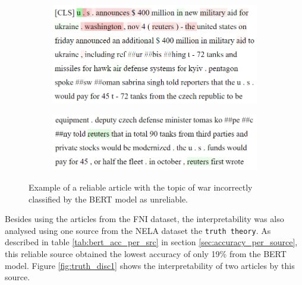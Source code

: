 \begin{figure}[H]
    \centering
    \begin{subfigure}{.5\textwidth}
      \centering
      \includegraphics[width=\linewidth]{obrazky-figures/war_fail.png}
      \label{fig:inter_anal6_a}
    \end{subfigure}%
    \begin{subfigure}{.5\textwidth}
      \centering
      \includegraphics[width=\linewidth]{obrazky-figures/war_fail_reuters.png}
      \label{fig:inter_anal6_b}
    \end{subfigure}
    \caption{Example of a reliable article with the topic of war incorrectly classified by the BERT model as unreliable.}
    \label{fig:inter_anal6}
\end{figure}

Besides using the articles from the FNI dataset, the interpretability was also analysed using one source from the NELA dataset the \texttt{truth theory}. As described in table \ref{tab:bert_acc_per_src} in section \ref{sec:accuracy_per_source}, this reliable source obtained the lowest accuracy of only 19\% from the BERT model. Figure \ref{fig:truth_disc1} shows the interpretability of two articles by this source. 


